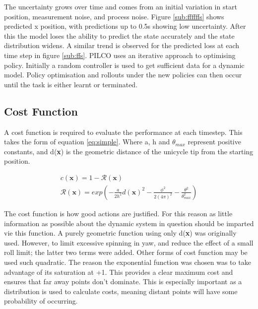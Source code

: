 \documentclass[twoside,twocolumn,12pt]{article}
\begin{document}
The uncertainty grows over time and comes from an initial variation in start position, measurement noise, and process noise. 
\newline
Figure \ref{sub:ffffffs} shows predicted x position, with predictions up to 0.5s showing low uncertainty. After this the model loses the ability to predict the state accurately and the state distribution widens. 
A similar trend is observed for the predicted loss at each time step in figure \ref{sub:ffs}.
\newline
PILCO uses an iterative approach to optimising policy. Initially a random controller is used to get sufficient data for a dynamic model. Policy optimisation and rollouts under the new policies can then occur until the task is either learnt or terminated. 


\subsection{Cost Function}
A cost function is required to evaluate the performance at each timestep. This takes the form of equation \ref{eq:simple}. Where a, h and $\theta_{max}$ represent positive constants, and d(\textbf{x}) is the geometric distance of the unicycle tip from the starting position.


\begin{equation}
\label{eq:simple}
\begin{gathered}
c(\textbf{x}) = 1 - \mathcal{R}(\textbf{x}) \\ 
\mathcal{R}(\textbf{x}) = exp(-\frac{a}{2h^2}d(\textbf{x})^2 - \frac{\phi^2}{2(4\pi)^2} - \frac{\theta^2}{\theta_{max}^2}) 
\end{gathered} 
\end{equation}

The cost function is how good actions are justified. For this reason as little information as possible about the dynamic system in question should be imparted vie this function. A purely geometric function using only d(\textbf{x}) was originally used. However, to limit excessive spinning in yaw, and reduce the effect of a small roll limit; the latter two terms were added.
\newline
Other forms of cost function may be used such  quadratic. The reason the exponential function was chosen was to take advantage of its saturation at +1. This provides a clear maximum cost and ensures that far away points don't dominate. This is especially important as a distribution is used to calculate costs, meaning distant points will have some probability of occurring. 
\end{document}
